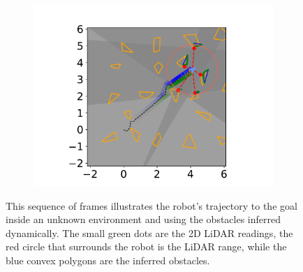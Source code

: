 \begin{figure}[H]
\begin{subfigure}{0.20\textwidth}
        \includegraphics[width=\textwidth]{../figures/Simulations/sim2unkenv/frame_9.pdf}
    \end{subfigure}
    \caption[short]{This sequence of frames illustrates the robot's trajectory to the goal inside an unknown environment and using the obstacles inferred dynamically. The small green dots are the 2D LiDAR readings, the red circle that surrounds the robot is the LiDAR range, while the blue convex polygons are the inferred obstacles.}
    \label{fig:unk_env_frames}
\end{figure}

